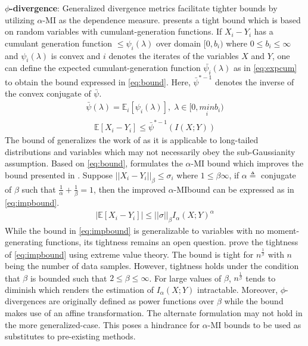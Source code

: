 \documentclass{article}
\begin{document}
\textbf{$\phi$-divergence}: Generalized divergence metrics facilitate tighter bounds by utilizing $\alpha$-MI as the dependence measure. \cite{control} presents a tight bound which is based on random variables with cumulant-generation functions. If $X_{i}-Y_{i}$ has a cumulant generation function $\leq \psi_{i}(\lambda)$ over domain $[0,b_{i})$ where $0 \leq b_{i} \leq \infty$ and $\psi_{i}(\lambda)$ is convex and $i$ denotes the iterates of the variables $X$ and $Y$, one can define the expected cumulant-generation function $\bar{\psi_{i}}(\lambda)$ as in \autoref{eq:expcum} to obtain the bound expressed in \autoref{eq:bound}. Here, $\bar{\psi}^{*-1}$ denotes the inverse of the convex conjugate of $\bar{\psi}$. 
\begin{gather}
  \bar{\psi}(\lambda) = \mathbb{E}_{i}[\psi_{i}(\lambda)],\; \lambda \in [0,\underset{i}{min}b_{i}) \label{eq:expcum}
\end{gather}
\begin{gather}
  \mathbb{E}[X_{i} - Y_{i}] \leq \bar{\psi}^{*-1}(I(X;Y)) \label{eq:bound}
\end{gather} 
The bound of \cite{control} generalizes the work of \cite{russo} as it is applicable to long-tailed distributions and variables which may not necessarily obey the sub-Gaussianity assumption. Based on \autoref{eq:bound}, \cite{control} formulates the $\alpha$-MI bound which improves the bound presented in \cite{russo}. Suppose $||X_{i} - Y_{i}||_{\beta} \leq \sigma_{i}$ where $1 \leq \beta \infty$, if $\alpha \triangleq$ conjugate of $\beta$ such that $\frac{1}{\alpha} + \frac{1}{\beta} = 1$, then the improved $\alpha$-MIbound can be expressed as in \autoref{eq:impbound}. 
\begin{gather}
  |\mathbb{E}[X_{i} - Y_{i}]| \leq ||\sigma||_{\beta}I_{\alpha}(X;Y)^{\alpha} \label{eq:impbound}
\end{gather}
While the bound in \autoref{eq:impbound} is generalizable to variables with no moment-generating functions, its tightness remains an open question. \cite{control} prove the tightness of \autoref{eq:impbound} using extreme value theory. The bound is tight for $n^{\frac{1}{\beta}}$ with $n$ being the number of data samples. However, tightness holds under the condition that $\beta$ is bounded such that $2 \leq \beta \leq \infty$. For large values of $\beta$, $n^{\frac{1}{\beta}}$ tends to diminish which renders the estimation of $I_{\alpha}(X;Y)$ intractable. Moreover, $\phi$-divergences are originally defined as power functions over $\beta$ while the bound makes use of an affine transformation. The alternate formulation may not hold in the more generalized-case. This poses a hindrance for $\alpha$-MI bounds to be used as substitutes to pre-existing methods. 
\end{document}
